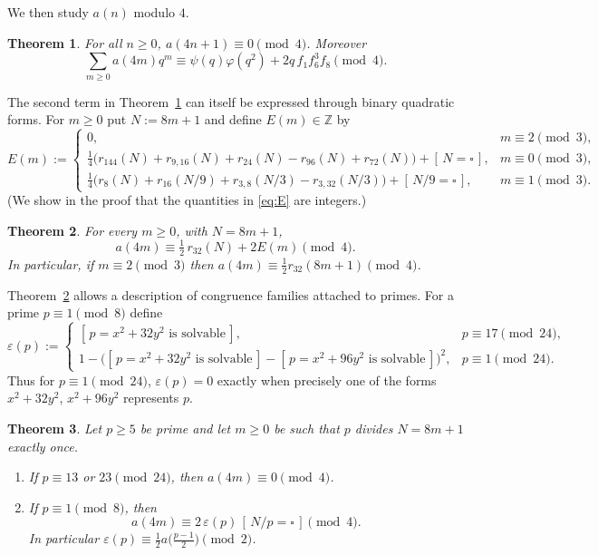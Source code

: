 \documentclass[11pt]{amsart}
\newtheorem{theorem}{Theorem}[section]
\theoremstyle{definition}
\theoremstyle{remark}
\numberwithin{equation}{section}
\newcommand{\Z}{\mathbb{Z}}
\newcommand{\sq}{\square}
\newcommand{\ind}[1]{[\,#1\,]}
\begin{document}
We then study $a(n)$ modulo $4$.

\begin{theorem}\label{thm:C}
For all $n\ge0$, $a(4n+1)\equiv 0\pmod 4$. Moreover
\[
\sum_{m\ge0}a(4m)q^m\equiv \psi(q)\varphi(q^2)+2q\,f_1f_6^3f_8\pmod 4 .
\]
\end{theorem}

The second term in Theorem~\ref{thm:C} can itself be expressed through binary quadratic forms. For $m\ge0$ put $N:=8m+1$ and define $E(m)\in\Z$ by
\begin{equation}\label{eq:E}
E(m):=\begin{cases}
0, & m\equiv 2\pmod 3,\\[2pt]
\tfrac14\big(r_{144}(N)+r_{9,16}(N)+r_{24}(N)-r_{96}(N)+r_{72}(N)\big)+\ind{N=\sq}, & m\equiv 0\pmod 3,\\[2pt]
\tfrac14\big(r_{8}(N)+r_{16}(N/9)+r_{3,8}(N/3)-r_{3,32}(N/3)\big)+\ind{N/9=\sq}, & m\equiv 1\pmod 3.
\end{cases}
\end{equation}
(We show in the proof that the quantities in \eqref{eq:E} are integers.)

\begin{theorem}\label{thm:D}
For every $m\ge0$, with $N=8m+1$,
\[
a(4m)\equiv \tfrac12\,r_{32}(N)+2E(m)\pmod 4 .
\]
In particular, if $m\equiv2\pmod3$ then $a(4m)\equiv\frac12 r_{32}(8m+1)\pmod 4$.
\end{theorem}

Theorem~\ref{thm:D} allows a description of congruence families attached to primes. For a prime $p\equiv1\pmod 8$ define
\begin{equation}\label{eq:eps}
\varepsilon(p):=\begin{cases}
\ind{p=x^2+32y^2\text{ is solvable}}, & p\equiv17\pmod{24},\\[2pt]
1-\big(\ind{p=x^2+32y^2\text{ is solvable}}-\ind{p=x^2+96y^2\text{ is solvable}}\big)^2, & p\equiv1\pmod{24}.
\end{cases}
\end{equation}
Thus for $p\equiv1\pmod{24}$, $\varepsilon(p)=0$ exactly when precisely one of the forms $x^2+32y^2$, $x^2+96y^2$ represents $p$.

\begin{theorem}\label{thm:E}
Let $p\ge5$ be prime and let $m\ge0$ be such that $p$ divides $N=8m+1$ exactly once.
\begin{enumerate}[label=\textup{(\alph*)}]
\item If $p\equiv 13$ or $23\pmod{24}$, then $a(4m)\equiv0\pmod 4$.
\item If $p\equiv1\pmod 8$, then
\[
a(4m)\equiv 2\,\varepsilon(p)\,\ind{N/p=\sq}\pmod 4 .
\]
In particular $\varepsilon(p)\equiv\frac12 a\big(\frac{p-1}{2}\big)\pmod 2$.
\end{enumerate}
\end{theorem}
\end{document}

